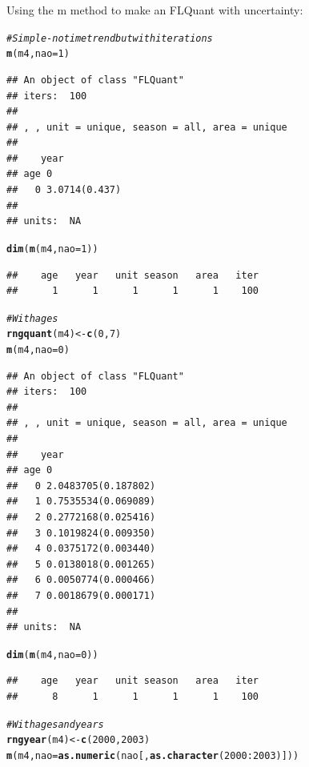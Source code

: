 \documentclass[a4paper,english,10pt]{article}\usepackage[]{graphicx}\usepackage[]{color}
\makeatletter
\newcommand{\hlnum}[1]{\textcolor[rgb]{0.686,0.059,0.569}{#1}}%
\newcommand{\hlcom}[1]{\textcolor[rgb]{0.678,0.584,0.686}{\textit{#1}}}%
\newcommand{\hlopt}[1]{\textcolor[rgb]{0,0,0}{#1}}%
\newcommand{\hlstd}[1]{\textcolor[rgb]{0.345,0.345,0.345}{#1}}%
\newcommand{\hlkwb}[1]{\textcolor[rgb]{0.69,0.353,0.396}{#1}}%
\newcommand{\hlkwc}[1]{\textcolor[rgb]{0.333,0.667,0.333}{#1}}%
\newcommand{\hlkwd}[1]{\textcolor[rgb]{0.737,0.353,0.396}{\textbf{#1}}}%
\newenvironment{kframe}{%
 \def\at@end@of@kframe{}%
 \ifinner\ifhmode%
  \def\at@end@of@kframe{\end{minipage}}%
  \begin{minipage}{\columnwidth}%
 \fi\fi%
 \def\FrameCommand##1{\hskip\@totalleftmargin \hskip-\fboxsep
 \colorbox{shadecolor}{##1}\hskip-\fboxsep
     \hskip-\linewidth \hskip-\@totalleftmargin \hskip\columnwidth}%
 \MakeFramed {\advance\hsize-\width
   \@totalleftmargin\z@ \linewidth\hsize
   \@setminipage}}%
 {\par\unskip\endMakeFramed%
 \at@end@of@kframe}
\newenvironment{knitrout}{}{} %
\makeatother
\begin{document}
Using the m method to make an FLQuant with uncertainty:

\begin{knitrout}
\color{fgcolor}\begin{kframe}
\begin{alltt}
\hlcom{# Simple - no time trend but with iterations}
\hlkwd{m}\hlstd{(m4,} \hlkwc{nao} \hlstd{=} \hlnum{1}\hlstd{)}
\end{alltt}
\begin{verbatim}
## An object of class "FLQuant"
## iters:  100 
## 
## , , unit = unique, season = all, area = unique
## 
##    year
## age 0            
##   0 3.0714(0.437)
## 
## units:  NA
\end{verbatim}
\begin{alltt}
\hlkwd{dim}\hlstd{(}\hlkwd{m}\hlstd{(m4,} \hlkwc{nao} \hlstd{=} \hlnum{1}\hlstd{))}
\end{alltt}
\begin{verbatim}
##    age   year   unit season   area   iter 
##      1      1      1      1      1    100
\end{verbatim}
\begin{alltt}
\hlcom{# With ages}
\hlkwd{rngquant}\hlstd{(m4)} \hlkwb{<-} \hlkwd{c}\hlstd{(}\hlnum{0}\hlstd{,} \hlnum{7}\hlstd{)}
\hlkwd{m}\hlstd{(m4,} \hlkwc{nao} \hlstd{=} \hlnum{0}\hlstd{)}
\end{alltt}
\begin{verbatim}
## An object of class "FLQuant"
## iters:  100 
## 
## , , unit = unique, season = all, area = unique
## 
##    year
## age 0                  
##   0 2.0483705(0.187802)
##   1 0.7535534(0.069089)
##   2 0.2772168(0.025416)
##   3 0.1019824(0.009350)
##   4 0.0375172(0.003440)
##   5 0.0138018(0.001265)
##   6 0.0050774(0.000466)
##   7 0.0018679(0.000171)
## 
## units:  NA
\end{verbatim}
\begin{alltt}
\hlkwd{dim}\hlstd{(}\hlkwd{m}\hlstd{(m4,} \hlkwc{nao} \hlstd{=} \hlnum{0}\hlstd{))}
\end{alltt}
\begin{verbatim}
##    age   year   unit season   area   iter 
##      8      1      1      1      1    100
\end{verbatim}
\begin{alltt}
\hlcom{# With ages and years}
\hlkwd{rngyear}\hlstd{(m4)} \hlkwb{<-} \hlkwd{c}\hlstd{(}\hlnum{2000}\hlstd{,} \hlnum{2003}\hlstd{)}
\hlkwd{m}\hlstd{(m4,} \hlkwc{nao} \hlstd{=} \hlkwd{as.numeric}\hlstd{(nao[,} \hlkwd{as.character}\hlstd{(}\hlnum{2000}\hlopt{:}\hlnum{2003}\hlstd{)]))}

\end{alltt}
\end{kframe}
\end{knitrout}
\end{document}
